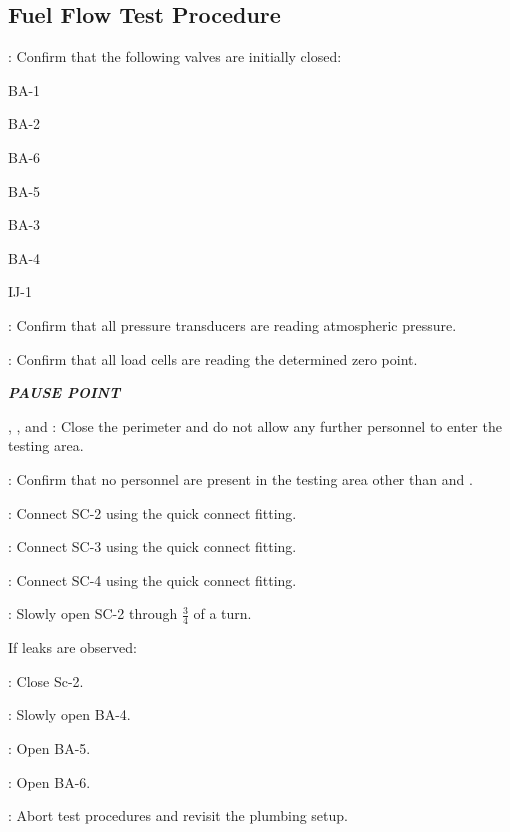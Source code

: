 \subsection{Fuel Flow Test Procedure}
\begin{checklist}
    \item \primary{}: Confirm that the following valves are initially closed:
    \begin{checklist}
		\item BA-1
        \item BA-2
        \item BA-6
        \item BA-5
		\item BA-3
		\item BA-4
		\item IJ-1
    \end{checklist}
    \item \daq{}: Confirm that all pressure transducers are reading atmospheric pressure.
    \item \daq{}: Confirm that all load cells are reading the determined zero point.
    \item \textbf{\textit{PAUSE POINT}}
    \item \peri{}, \perii{}, and \periii{}: Close the perimeter and do not allow any further personnel to enter the testing area.
    \item \secondary: Confirm that no personnel are present in the testing area other than \primary{} and \secondary.
    \item \primary{}: Connect SC-2 using the quick connect fitting.
    \item \primary{}: Connect SC-3 using the quick connect fitting.
    \item \primary{}: Connect SC-4 using the quick connect fitting.
    \item \primary{}: Slowly open SC-2 through $\frac{3}{4}$ of a turn.
    \item If leaks are observed:
    \begin{checklist}
            \item \primary{}: Close Sc-2. 
            \item \primary{}: Slowly open BA-4.
            \item \primary{}: Open BA-5. 
            \item \primary{}: Open BA-6. 
            \item \ops{}: Abort test procedures and revisit the plumbing setup. 
    \end{checklist}

\end{checklist}
